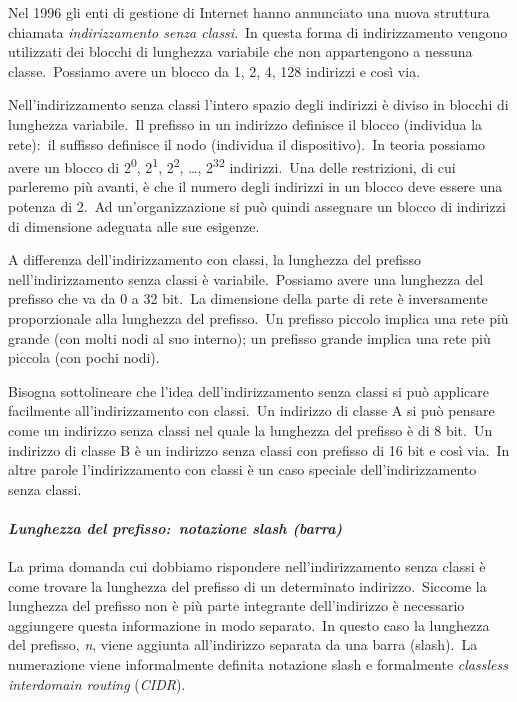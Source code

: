 Nel 1996 gli enti di gestione di Internet hanno annunciato una nuova struttura chiamata \emph{indirizzamento senza classi}.\
In questa forma di indirizzamento vengono utilizzati dei blocchi di lunghezza variabile che non appartengono a nessuna classe.\
Possiamo avere un blocco da 1, 2, 4, 128 indirizzi e così via.

Nell'indirizzamento senza classi l'intero spazio degli indirizzi è diviso in blocchi di lunghezza variabile.\
Il prefisso in un indirizzo definisce il blocco (individua la rete):\ il suffisso definisce il nodo (individua il dispositivo).\
In teoria possiamo avere un blocco di 2\textsuperscript{0}, 2\textsuperscript{1}, 2\textsuperscript{2}, \dots, 2\textsuperscript{32} indirizzi.\
Una delle restrizioni, di cui parleremo più avanti, è che il numero degli indirizzi in un blocco deve essere una potenza di 2.\
Ad un'organizzazione si può quindi assegnare un blocco di indirizzi di dimensione adeguata alle sue esigenze.

A differenza dell'indirizzamento con classi, la lunghezza del prefisso nell'indirizzamento senza classi è variabile.\
Possiamo avere una lunghezza del prefisso che va da 0 a 32 bit.\
La dimensione della parte di rete è inversamente proporzionale alla lunghezza del prefisso.\
Un prefisso piccolo implica una rete più grande (con molti nodi al suo interno); un prefisso grande implica una rete più piccola (con pochi nodi).

Bisogna sottolineare che l'idea dell'indirizzamento senza classi si può applicare facilmente all'indirizzamento con classi.\
Un indirizzo di classe A si può pensare come un indirizzo senza classi nel quale la lunghezza del prefisso è di 8 bit.\
Un indirizzo di classe B è un indirizzo senza classi con prefisso di 16 bit e così via.\
In altre parole l'indirizzamento con classi è un caso speciale dell'indirizzamento senza classi.

\paragraph{\emph{Lunghezza del prefisso:\ notazione slash (barra)}}
La prima domanda cui dobbiamo rispondere nell'indirizzamento senza classi è come trovare la lunghezza del prefisso di un determinato indirizzo.\
Siccome la lunghezza del prefisso non è più parte integrante dell'indirizzo è necessario aggiungere questa informazione in modo separato.\
In questo caso la lunghezza del prefisso, \emph{n}, viene aggiunta all'indirizzo separata da una barra (slash).\
La numerazione viene informalmente definita notazione slash e formalmente \emph{classless interdomain routing} (\emph{CIDR}).

